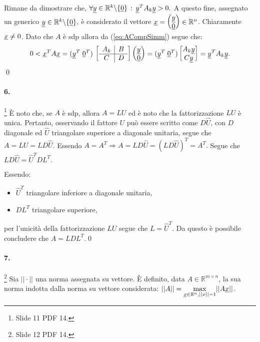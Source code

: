 \noindent Rimane da dimostrare che, $\forall \uline y\in\mathbb R^k\backslash\{\uline 0\}\,:\, \uline y^TA_k\uline y > 0.$ A questo fine, assegnato un generico $\uline y\in\mathbb R^k\backslash\{\uline 0\}$, è considerato il vettore $\uline x=
\begin{pmatrix}
    \uline y\\
    \uline 0
\end{pmatrix}\in\mathbb R^n$. Chiaramente $\uline x\neq 0$. Dato che $A$ è sdp allora da (\ref{eq:ACompSimm}) segue che:
\begin{equation*}
    0<\uline x^T A \uline x = (\uline y^T\; \uline 0^T)\,\left[\begin{array}{c|c}
       A_k & B\\
       \hline
       C& D
    \end{array}
    \right]
    \begin{pmatrix}
        \uline y\\
        \uline 0
    \end{pmatrix} = 
    (\uline y^T\; \uline 0^T)
    \begin{bmatrix}
        A_k \uline y\\
        C \uline y
    \end{bmatrix} = \uline y^T A_k \uline y.
\end{equation*}\qed

\paragraph{6.}\footnote{Slide 11 PDF 14.}
È noto che, se $A$ è sdp, allora $A=LU$ ed è noto che la fattorizzazione $LU$ è unica. Pertanto, osservando il fattore $U$ può essere scritto come $D\widehat{U}$, con $D$ diagonale ed $\widehat{U}$ triangolare superiore a diagonale unitaria, segue che $A=LU=LD\widehat{U}$. Essendo $A=A^T\Rightarrow A=LD\widehat{U}=(LD\widehat{U})^T=A^T.$ Segue che $LD\widehat{U}=\widehat{U}^TDL^T.$

\noindent Essendo:
\begin{itemize}
    \item $\widehat{U}^T$ triangolare inferiore a diagonale unitaria,
    \item $DL^T$ triangolare superiore,
\end{itemize}
per l'unicità della fattorizzazione $LU$ segue che $L=\widehat{U}^T$. Da questo è possibile concludere che $A=LDL^T.$\qed

\paragraph{7.}\footnote{Slide 12 PDF 14.} Sia $||\cdot||$ una norma assegnata su vettore. È definito, data $A\in\mathbb R^{m\times n}$, la sua norma indotta dalla norma su vettore considerata: $||A||=\underset{\uline x\in\mathbb R^n, ||x||=1}{\max}||A\uline x||$.

